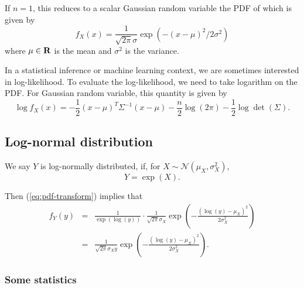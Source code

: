 If $n=1$, this reduces to a scalar Gaussian random variable the PDF of which is given by
\begin{equation}
f_X(x) = \frac{1}{\sqrt{2\pi}\sigma} \exp\left( - (x-\mu)^2 /2\sigma^2 \right)
\end{equation}
where $\mu\in\mathbf{R}$ is the mean and $\sigma^2$ is the variance.

In a statistical inference or machine learning context, we are sometimes interested in log-likelihood.
To evaluate the log-likelihood, we need to take logarithm on the PDF.
For Gaussian random variable,
this quantity is given by
\begin{equation}
\log f_X(x) = -\frac{1}{2} (x-\mu)^T \Sigma^{-1} (x-\mu) - \frac{n}{2} \log(2\pi) - \frac{1}{2} \log \det(\Sigma).
\end{equation}







\subsection{Log-normal distribution}

 We say $Y$ is log-normally distributed, if, for $X\sim\mathcal{N}(\mu_X,\sigma_X^2)$,
 \begin{equation}
 Y = \exp(X).
 \end{equation}

Then (\ref{eq:pdf-transform}) implies that
\begin{eqnarray}
f_Y(y) &=& \frac{1}{\exp(\log(y))} \cdot \frac{1}{\sqrt{2\pi} \sigma_X}  \exp\left(-\frac{(\log(y)-\mu_X)^2}{2\sigma_X^2}\right)
\nonumber
\\
&=& \frac{1}{\sqrt{2\pi} \sigma_X y}  \exp\left(-\frac{(\log(y)-\mu_X)^2}{2\sigma_X^2}\right).
\label{eq:log-normal-pdf}
\end{eqnarray}


\subsubsection{Some statistics}

